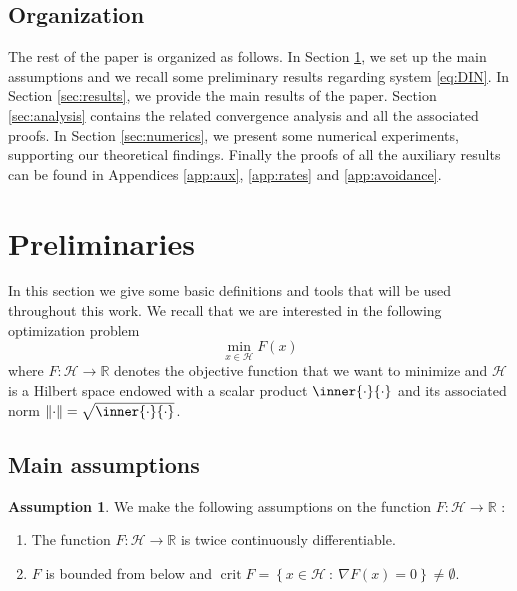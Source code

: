 \documentclass[reqno]{amsart}
\theoremstyle{plain}
\theoremstyle{definition}
\newtheorem{assumption}{Assumption}	%
\theoremstyle{remark}
\newcommand{\R}{\mathbb{R}}	%
\DeclareMathOperator{\crit}{crit}	%
\DeclarePairedDelimiter{\norm}{\lVert}{\rVert}	%
\newcommand{\VA}{\VAcomment}
\newcommand{\Hb}{\mathcal{H}}
\begin{document}
\subsection{Organization}
The rest of the paper is organized as follows. In Section \ref{sec:prelims}, we set up the main assumptions and we recall some preliminary results regarding system \eqref{eq:DIN}. In Section \ref{sec:results}, we provide the main results of the paper. Section \ref{sec:analysis} contains the related convergence analysis and all the associated proofs.
In Section \ref{sec:numerics}, we present some numerical experiments, supporting our theoretical findings. Finally the proofs of all the auxiliary results can be found in Appendices \ref{app:aux}, \ref{app:rates} and \ref{app:avoidance}.


\section{Preliminaries}
\label{sec:prelims}

In this section we give some basic definitions and tools that will be used throughout this work. We recall that we are interested in the following optimization problem
\begin{equation}\label{minimization problem}
    \underset{x\in\Hb}{\min}F(x)
\end{equation}
where $F:\Hb\to\R$ denotes the objective function that we want to minimize and $\Hb$ is a Hilbert space endowed with a scalar product $\inner{\cdot}{\cdot}$ and its associated norm $\norm{\cdot}=\sqrt{\inner{\cdot}{\cdot}}$.

\subsection{Main assumptions}
\begin{assumption}
\label{asm:obj}
\label{assumption basic F}
We make the following assumptions on the function $F:\Hb\to\R$ :
\begin{enumerate}
\item The function $F:\Hb\to\R$ is twice continuously differentiable.
\item $F$ is bounded from below and $\crit{F}=\left\{x\in \Hb~:~\nabla F(x)=0\right\}\neq \emptyset$. %
\end{enumerate}
\end{assumption}
\end{document}
